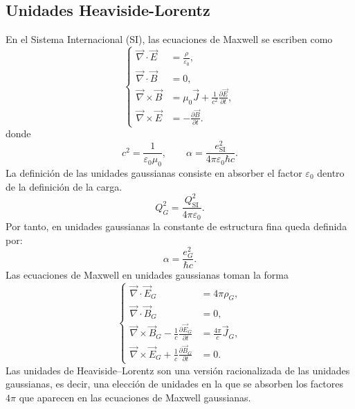 \documentclass[a4paper,11pt]{book} %
\begin{document}
\subsection{Unidades Heaviside-Lorentz}
\noindent
En el Sistema Internacional (SI), las ecuaciones de Maxwell se escriben como
\begin{equation}
\left\{
\begin{aligned}
    \vec{\nabla}\cdot \vec{E} &= \frac{\rho}{\varepsilon_0}, \\
    \vec{\nabla}\cdot \vec{B} &= 0, \\
    \vec{\nabla}\times \vec{B} 
    &= \mu_0 \vec{J}
    + \frac{1}{c^2}\frac{\partial \vec{E}}{\partial t}, \\
    \vec{\nabla}\times \vec{E}
    &= -\frac{\partial \vec{B}}{\partial t}.
\end{aligned}
\right.
\end{equation}
donde
\begin{equation}
    c^2 = \frac{1}{\varepsilon_0 \mu_0},
    \qquad
    \alpha = \frac{e_{\text{SI}}^2}{4\pi \varepsilon_0 \hbar c}.
\end{equation}
La definición de las unidades gaussianas consiste en absorber el factor
$\varepsilon_0$ dentro de la definición de la carga.
\begin{equation}
    Q_G^2 = \frac{Q_{\text{SI}}^2}{4\pi\varepsilon_0}.
\end{equation}
Por tanto, en unidades gaussianas la constante de estructura fina queda definida por:
\begin{equation}
    \alpha = \frac{e_G^2}{\hbar c}.
\end{equation}
Las ecuaciones de Maxwell en unidades gaussianas toman la forma
\begin{equation}
\left\{
\begin{aligned}
    \vec{\nabla}\cdot \vec{E}_G &= 4\pi \rho_G, \\
    \vec{\nabla}\cdot \vec{B}_G &= 0, \\
    \vec{\nabla}\times \vec{B}_G 
    - \frac{1}{c}\frac{\partial \vec{E}_G}{\partial t}
    &= \frac{4\pi}{c}\vec{J}_G, \\
    \vec{\nabla}\times \vec{E}_G
    + \frac{1}{c}\frac{\partial \vec{B}_G}{\partial t}
    &= 0.
\end{aligned}
\right.
\end{equation}
Las unidades de Heaviside--Lorentz son una versión racionalizada de las
unidades gaussianas, es decir, una elección de unidades en la que se absorben
los factores $4\pi$ que aparecen en las ecuaciones de Maxwell gaussianas.
\end{document}
